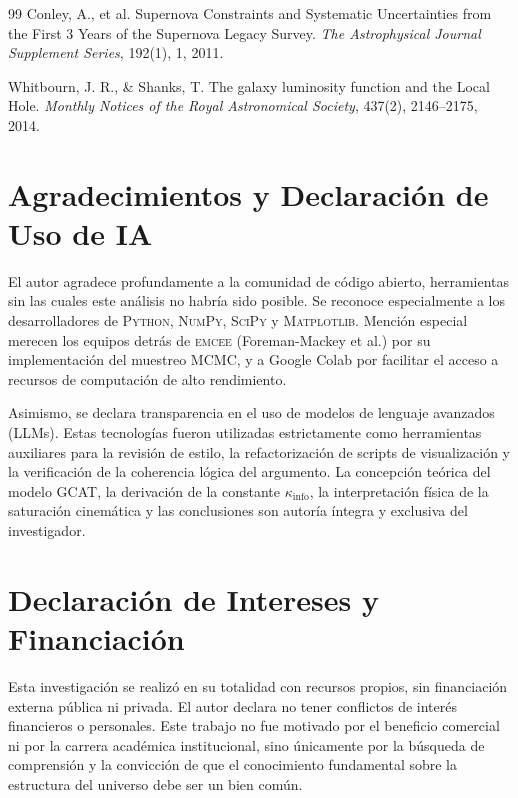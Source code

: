\documentclass[12pt, a4paper]{article}
\theoremstyle{plain}
\theoremstyle{definition}
\begin{document}
\begin{thebibliography}{99}
Conley, A., et al.
\newblock Supernova Constraints and Systematic Uncertainties from the First 3 Years of the Supernova Legacy Survey.
\newblock \textit{The Astrophysical Journal Supplement Series}, 192(1), 1, 2011.

Whitbourn, J. R., \& Shanks, T.
\newblock The galaxy luminosity function and the Local Hole.
\newblock \textit{Monthly Notices of the Royal Astronomical Society}, 437(2), 2146–2175, 2014.

\end{thebibliography}

\section*{Agradecimientos y Declaración de Uso de IA}

El autor agradece profundamente a la comunidad de código abierto, herramientas sin las cuales este análisis no habría sido posible. Se reconoce especialmente a los desarrolladores de \textsc{Python}, \textsc{NumPy}, \textsc{SciPy} y \textsc{Matplotlib}. Mención especial merecen los equipos detrás de \textsc{emcee} (Foreman-Mackey et al.) por su implementación del muestreo MCMC, y a Google Colab por facilitar el acceso a recursos de computación de alto rendimiento.

Asimismo, se declara transparencia en el uso de modelos de lenguaje avanzados (LLMs). Estas tecnologías fueron utilizadas estrictamente como herramientas auxiliares para la revisión de estilo, la refactorización de scripts de visualización y la verificación de la coherencia lógica del argumento. La concepción teórica del modelo GCAT, la derivación de la constante $\kappa_{\text{info}}$, la interpretación física de la saturación cinemática y las conclusiones son autoría íntegra y exclusiva del investigador.

\section*{Declaración de Intereses y Financiación}

Esta investigación se realizó en su totalidad con recursos propios, sin financiación externa pública ni privada. El autor declara no tener conflictos de interés financieros o personales. Este trabajo no fue motivado por el beneficio comercial ni por la carrera académica institucional, sino únicamente por la búsqueda de comprensión y la convicción de que el conocimiento fundamental sobre la estructura del universo debe ser un bien común.
\end{document}
